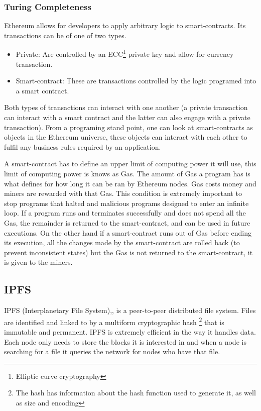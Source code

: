 \documentclass[llncsdoc]{llncs}
\begin{document}
\subsubsection{Turing Completeness}
Ethereum allows for developers to apply arbitrary logic to smart-contracts. Its transactions can be of one of two types.
\begin{itemize}
    \item Private: Are controlled by an ECC\footnote{Elliptic curve cryptography} private key and allow for currency transaction.
    \item Smart-contract: These are transactions controlled by the logic programed into a smart contract.
\end{itemize}
Both types of transactions can interact with one another (a private transaction can interact with a smart contract and the latter can also engage with a private transaction).
From a programing stand point, one can look at smart-contracts as objects in the Ethereum universe, these objects can interact with each other to fulfil any business rules required by an application.

A smart-contract has to define an upper limit of computing power it will use, this limit of computing power is knows as Gas. The amount of Gas a program has is what defines for how long it can be ran by Ethereum nodes. Gas costs money and miners are rewarded with that Gas. This condition is extremely important to stop programs that halted and malicious programs designed to enter an infinite loop. If a program runs and terminates successfully and does not spend all the Gas, the remainder is returned to the smart-contract, and can be used in future executions. On the other hand if a smart-contract runs out of Gas before ending its execution, all the changes made by the smart-contract are rolled back (to prevent inconsistent states) but the Gas is not returned to the smart-contract, it is given to the miners.







\subsection{IPFS}

IPFS (Interplanetary File System),\cite{Benet:2014vw}, is a peer-to-peer distributed file system.
Files are identified and linked to by a multiform cryptographic hash \footnote{The hash has information about the hash function used to generate it, as well as size and encoding} that is immutable and permanent. IPFS is extremely efficient in the way it handles data. Each node only needs to store the blocks it is interested in and when a node is searching for a file it queries the network for nodes who have that file.
\end{document}

